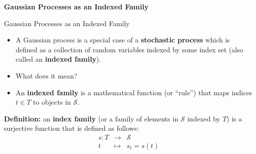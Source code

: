 \framebreak

\begin{frame}[c]{}
\centering
\huge
\textbf{Gaussian Processes as an Indexed Family}
\end{frame}


\begin{frame}[c]{Gaussian Processes as an Indexed Family}

\begin{itemize}
\item A Gaussian process is a special case of a \textbf{stochastic process} which is defined as a collection of random variables indexed by some index set (also called an \textbf{indexed family}).
\lz
\item What does it mean?
\lz
\item An \textbf{indexed family} is a mathematical function (or ``rule'') that maps indices $t \in T$ to objects in $\mathcal{S}$.
\end{itemize}
\lz


\begin{displayquote} 
\textbf{Definition:} an \textbf{index family} (or a family of elements in $\mathcal{S}$ indexed by $T$) is a surjective function that is defined as follows:
\vspace{-.2cm}
\begin{eqnarray*}
s: T &\to& \mathcal{S} \\
   t &\mapsto& s_t = s(t) 
\end{eqnarray*}

\end{displayquote}

\end{frame}


